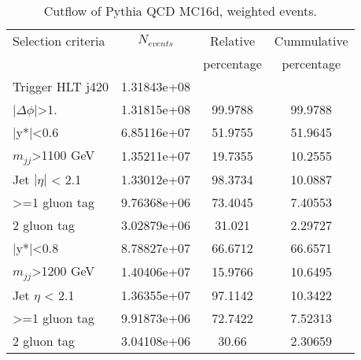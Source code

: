 \begin{table}[ht]
\begin{center}
\begin{tabular}{|l|c|c|c|}
\hline
Selection criteria & $N_{events}$ & Relative & Cummulative  \\
 & & percentage & percentage \\
\hline
Trigger HLT j420 & 1.31843e+08 &  &  \\
$|\Delta\phi|$>1. & 1.31815e+08 & 99.9788 & 99.9788 \\
\hline\hline
|y*|<0.6 & 6.85116e+07 & 51.9755 & 51.9645 \\
$m_{jj}$>1100 GeV & 1.35211e+07 & 19.7355 & 10.2555 \\
Jet $|\eta|$ < 2.1 & 1.33012e+07 & 98.3734 & 10.0887 \\
>=1 gluon tag & 9.76368e+06 & 73.4045 & 7.40553 \\
2 gluon tag & 3.02879e+06 & 31.021 & 2.29727 \\
\hline\hline
|y*|<0.8 & 8.78827e+07 & 66.6712 & 66.6571 \\
$m_{jj}$>1200 GeV & 1.40406e+07 & 15.9766 & 10.6495 \\
Jet $\eta$ < 2.1 & 1.36355e+07 & 97.1142 & 10.3422 \\
>=1 gluon tag & 9.91873e+06 & 72.7422 & 7.52313 \\
2 gluon tag & 3.04108e+06 & 30.66 & 2.30659 \\
\hline
\end{tabular}
\end{center}
\caption{Cutflow of Pythia QCD MC16d, weighted events.}
\end{table}

